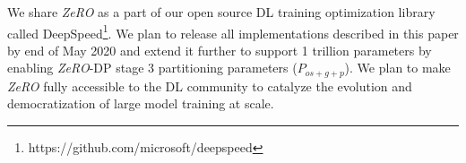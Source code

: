 \documentclass{article}
\newcommand{\name}{\emph{ZeRO}\xspace}
\begin{document}

We share \name as a part of our open source DL training optimization library called DeepSpeed\footnote{https://github.com/microsoft/deepspeed}.
We plan to release all implementations described in this paper by end of May 2020 and extend it further to support 1 trillion parameters by enabling \name-DP stage 3 partitioning parameters ($P_{os+g+p}$). We plan to make \name fully accessible to the DL community to catalyze the evolution and democratization of large model training at scale.  
 
\end{document}
